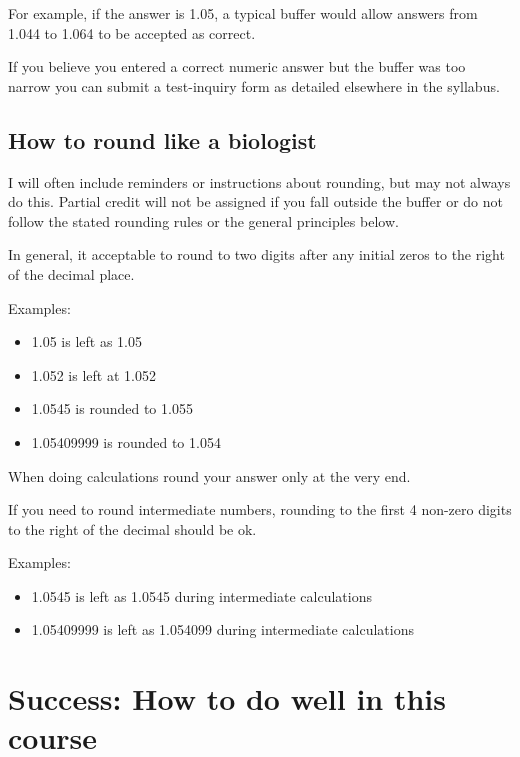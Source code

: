 \documentclass[
]{book}
\providecommand{\tightlist}{%
  \setlength{\itemsep}{0pt}\setlength{\parskip}{0pt}}
\begin{document}
For example, if the answer is 1.05, a typical buffer would allow answers from 1.044 to 1.064 to be accepted as correct.

If you believe you entered a correct numeric answer but the buffer was too narrow you can submit a test-inquiry form as detailed elsewhere in the syllabus.

\hypertarget{how-to-round-like-a-biologist}{%
\section{How to round like a biologist}\label{how-to-round-like-a-biologist}}

I will often include reminders or instructions about rounding, but may not always do this. Partial credit will not be assigned if you fall outside the buffer or do not follow the stated rounding rules or the general principles below.

In general, it acceptable to round to two digits after any initial zeros to the right of the decimal place.

Examples:

\begin{itemize}
\tightlist
\item
  1.05 is left as 1.05
\item
  1.052 is left at 1.052
\item
  1.0545 is rounded to 1.055
\item
  1.05409999 is rounded to 1.054
\end{itemize}

When doing calculations round your answer only at the very end.

If you need to round intermediate numbers, rounding to the first 4 non-zero digits to the right of the decimal should be ok.

Examples:

\begin{itemize}
\tightlist
\item
  1.0545 is left as 1.0545 during intermediate calculations
\item
  1.05409999 is left as 1.054099 during intermediate calculations
\end{itemize}

\hypertarget{success-how-to-do-well-in-this-course}{%
\chapter{Success: How to do well in this course}\label{success-how-to-do-well-in-this-course}}
\end{document}
